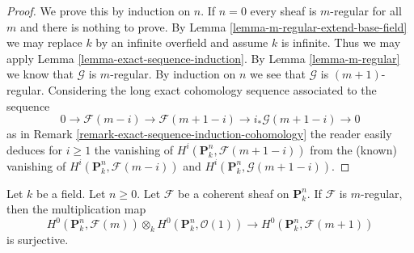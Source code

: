\begin{proof}
We prove this by induction on $n$. If $n = 0$ every sheaf is $m$-regular
for all $m$ and there is nothing to prove. By
Lemma \ref{lemma-m-regular-extend-base-field} we may replace $k$
by an infinite overfield and assume $k$ is infinite.
Thus we may apply Lemma \ref{lemma-exact-sequence-induction}.
By Lemma \ref{lemma-m-regular} we know that $\mathcal{G}$ is
$m$-regular. By induction on $n$ we see that $\mathcal{G}$ is
$(m + 1)$-regular. Considering the long exact cohomology sequence
associated to the sequence
$$
0 \to \mathcal{F}(m - i) \to \mathcal{F}(m + 1 - i)
\to i_*\mathcal{G}(m + 1 - i) \to 0
$$
as in Remark \ref{remark-exact-sequence-induction-cohomology}
the reader easily deduces for $i \geq 1$ the vanishing of
$H^i(\mathbf{P}^n_k, \mathcal{F}(m + 1 - i))$ from the (known) vanishing of
$H^i(\mathbf{P}^n_k, \mathcal{F}(m - i))$ and
$H^i(\mathbf{P}^n_k, \mathcal{G}(m + 1 - i))$.
\end{proof}

\begin{lemma}
\label{lemma-m-regular-multiply}
Let $k$ be a field. Let $n \geq 0$.
Let $\mathcal{F}$ be a coherent sheaf on $\mathbf{P}^n_k$.
If $\mathcal{F}$ is $m$-regular, then the multiplication map
$$
H^0(\mathbf{P}^n_k, \mathcal{F}(m)) \otimes_k
H^0(\mathbf{P}^n_k, \mathcal{O}(1))
\longrightarrow
H^0(\mathbf{P}^n_k, \mathcal{F}(m + 1))
$$
is surjective.
\end{lemma}

